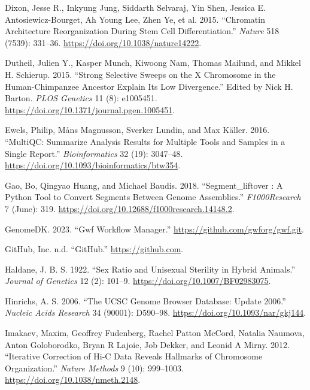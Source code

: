 \documentclass[
  11pt,
  a4paper,
]{scrbook}
\newlength{\cslhangindent}
\newenvironment{CSLReferences}[2] %
 {\begin{list}{}{%
  \setlength{\itemindent}{0pt}
  \setlength{\leftmargin}{0pt}
  \setlength{\parsep}{0pt}
  \ifodd #1
   \setlength{\leftmargin}{\cslhangindent}
   \setlength{\itemindent}{-1\cslhangindent}
  \fi
  \setlength{\itemsep}{#2\baselineskip}}}
 {\end{list}}
\begin{document}
\begin{CSLReferences}{1}{0}
Dixon, Jesse R., Inkyung Jung, Siddarth Selvaraj, Yin Shen, Jessica E.
Antosiewicz-Bourget, Ah Young Lee, Zhen Ye, et al. 2015. {``Chromatin
Architecture Reorganization During Stem Cell Differentiation.''}
\emph{Nature} 518 (7539): 331--36.
\url{https://doi.org/10.1038/nature14222}.

Dutheil, Julien Y., Kasper Munch, Kiwoong Nam, Thomas Mailund, and
Mikkel H. Schierup. 2015. {``Strong {Selective Sweeps} on the {X
Chromosome} in the {Human-Chimpanzee Ancestor Explain Its Low
Divergence}.''} Edited by Nick H. Barton. \emph{PLOS Genetics} 11 (8):
e1005451. \url{https://doi.org/10.1371/journal.pgen.1005451}.

Ewels, Philip, Måns Magnusson, Sverker Lundin, and Max Käller. 2016.
{``{MultiQC}: Summarize Analysis Results for Multiple Tools and Samples
in a Single Report.''} \emph{Bioinformatics} 32 (19): 3047--48.
\url{https://doi.org/10.1093/bioinformatics/btw354}.

Gao, Bo, Qingyao Huang, and Michael Baudis. 2018. {``Segment\_liftover :
A {Python} Tool to Convert Segments Between Genome Assemblies.''}
\emph{F1000Research} 7 (June): 319.
\url{https://doi.org/10.12688/f1000research.14148.2}.

GenomeDK. 2023. {``Gwf Workflow Manager.''}
\url{https://github.com/gwforg/gwf.git}.

GitHub, Inc. n.d. {``GitHub.''} \url{https://github.com}.

Haldane, J. B. S. 1922. {``Sex Ratio and Unisexual Sterility in Hybrid
Animals.''} \emph{Journal of Genetics} 12 (2): 101--9.
\url{https://doi.org/10.1007/BF02983075}.

Hinrichs, A. S. 2006. {``The {UCSC Genome Browser Database}: Update
2006.''} \emph{Nucleic Acids Research} 34 (90001): D590--98.
\url{https://doi.org/10.1093/nar/gkj144}.

Imakaev, Maxim, Geoffrey Fudenberg, Rachel Patton McCord, Natalia
Naumova, Anton Goloborodko, Bryan R Lajoie, Job Dekker, and Leonid A
Mirny. 2012. {``Iterative Correction of {Hi-C} Data Reveals Hallmarks of
Chromosome Organization.''} \emph{Nature Methods} 9 (10): 999--1003.
\url{https://doi.org/10.1038/nmeth.2148}.


\end{CSLReferences}
\end{document}
